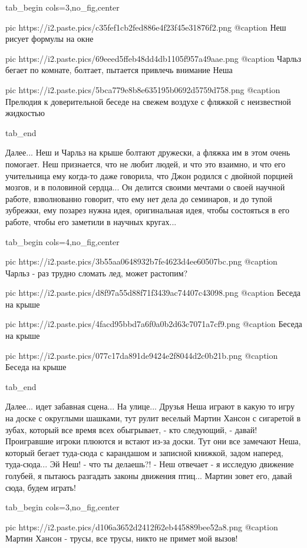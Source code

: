 \ifcmt
  tab_begin cols=3,no_fig,center

     pic https://i2.paste.pics/c35fef1cb2fed886e4f23f45e31876f2.png
		 @caption Неш рисует формулы на окне
		 
		 pic https://i2.paste.pics/69eeed5ffeb48dd4db1105f957a49aae.png
		 @caption Чарльз бегает по комнате, болтает, пытается привлечь внимание Неша

		 pic https://i2.paste.pics/5bca779e8b8e635195b0692d5759d758.png
		 @caption Прелюдия к доверительной беседе на свежем воздухе с фляжкой с неизвестной жидкостью

  tab_end
\fi

Далее... Неш и Чарльз на крыше болтают дружески, а фляжка им в этом очень помогает. Неш признается,
что не любит людей, и что это взаимно, и что его учительница ему когда-то даже говорила, что Джон
родился с двойной порцией мозгов, и в половиной сердца... Он делится своими мечтами о своей научной работе,
взволнованно говорит, что ему нет дела до семинаров, и до тупой зубрежки, ему позарез нужна идея, оригинальная идея,
чтобы состояться в его работе, чтобы его заметили в научных кругах... 

\ifcmt
  tab_begin cols=4,no_fig,center

     pic https://i2.paste.pics/3b55aa0648932b7fe4623d4ee60507bc.png
		 @caption Чарльз - раз трудно сломать лед, может растопим?

		 pic https://i2.paste.pics/d8f97a55d88f71f3439ac74407c43098.png
		 @caption Беседа на крыше

		 pic https://i2.paste.pics/4facd95bbd7a6f0a0b2d63c7071a7cf9.png
		 @caption Беседа на крыше

		 pic https://i2.paste.pics/077c17da891de9424e2f8044d2c0b21b.png
		 @caption Беседа на крыше

  tab_end
\fi

Далее... идет забавная сцена... На улице... Друзья Неша играют в какую то игру
на доске с округлыми шашками, тут рулит веселый Мартин Хансон с сигаретой в
зубах, который все время всех обыгрывает, - кто следующий, - давай!
Проигравшие игроки плюются и встают из-за доски. Тут они все замечают Неша,
который бегает туда-сюда с карандашом и записной книжкой, задом наперед,
туда-сюда... Эй Неш! - что ты делаешь?! - Неш отвечает - я исследую движение
голубей, я пытаюсь разгадать законы движения птиц... Мартин зовет его, давай
сюда, будем играть! 

\ifcmt
  tab_begin cols=3,no_fig,center

     pic https://i2.paste.pics/d106a3652d2412f62eb445889bee52a8.png
		 @caption Мартин Хансон - трусы, все трусы, никто не примет мой вызов!

